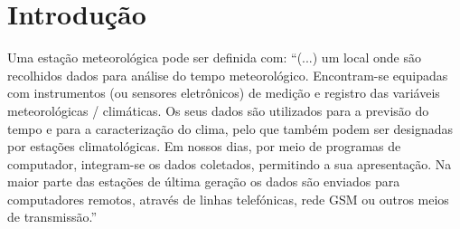 \documentclass[twocolumn,11pt]{article}
\begin{document}
\section{Introdução}
Uma estação meteorológica pode ser definida com:
“(...) um local onde são recolhidos dados para análise do tempo meteorológico. Encontram-se equipadas com instrumentos (ou sensores eletrônicos) de medição e registro das variáveis meteorológicas / climáticas. Os seus dados são utilizados para a previsão do tempo e para a caracterização do clima, pelo que também podem ser designadas por estações climatológicas. Em nossos dias, por meio de programas de computador, integram-se os dados coletados, permitindo a sua apresentação. Na maior parte das estações de última geração os dados são enviados para computadores remotos, através de linhas telefónicas, rede GSM ou outros meios de transmissão.” \cite{wikiestacao}
\end{document}
